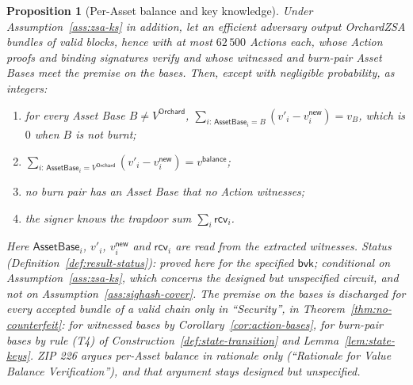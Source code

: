 \documentclass[11pt,a4paper]{article}
\newtheorem{proposition}[theorem]{Proposition}
\theoremstyle{definition}
\newcommand{\rcv}{\ensuremath{\mathsf{rcv}}}
\begin{document}
\begin{proposition}[Per-Asset balance and key knowledge]
Under Assumption~\ref{ass:zsa-ks} in addition, let an efficient adversary
output OrchardZSA bundles of valid blocks, hence with at most $62\,500$
Actions each, whose Action proofs and binding signatures verify
and whose witnessed and burn-pair Asset Bases meet the premise on the
bases. Then, except with negligible probability, as integers:
\begin{enumerate}
\item[(a)] for every Asset Base $B \neq V^{\mathsf{Orchard}}$,
  $\sum_{i :\, \mathsf{AssetBase}_i = B} (v'_i - v^{\mathsf{new}}_i) =
  v_B$, which is $0$ when $B$ is not burnt;
\item[(b)] $\sum_{i :\, \mathsf{AssetBase}_i = V^{\mathsf{Orchard}}}
  (v'_i - v^{\mathsf{new}}_i) = v^{\mathsf{balance}}$;
\item[(c)] no burn pair has an Asset Base that no Action witnesses;
\item[(d)] the signer knows the trapdoor sum $\sum_i \rcv_i$.
\end{enumerate}
Here $\mathsf{AssetBase}_i$, $v'_i$, $v^{\mathsf{new}}_i$ and $\rcv_i$ are
read from the extracted witnesses. Status
(Definition~\ref{def:result-status}): proved here for the specified
$\mathsf{bvk}$; conditional on Assumption~\ref{ass:zsa-ks}, which concerns
the designed but unspecified circuit, and not on
Assumption~\ref{ass:sighash-cover}. The premise on the bases is discharged
for every accepted bundle of a valid chain only in ``Security'', in
Theorem~\ref{thm:no-counterfeit}: for witnessed bases by
Corollary~\ref{cor:action-bases}, for burn-pair bases by rule (T4) of
Construction~\ref{def:state-transition} and Lemma~\ref{lem:state-keys}.
ZIP 226 argues per-Asset balance in rationale only (``Rationale for Value
Balance Verification''), and that argument stays designed but unspecified.
\end{proposition}
\end{document}
